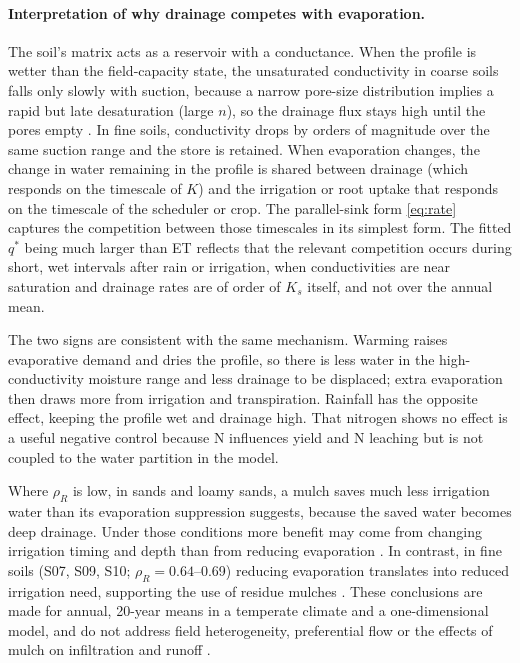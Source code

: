 \documentclass[preprint,12pt,authoryear]{elsarticle}
\begin{document}
\paragraph{Interpretation of why drainage competes with evaporation.}
The soil's matrix acts as a reservoir with a conductance. When the profile is wetter than the field-capacity state, the unsaturated conductivity in coarse soils falls only slowly with suction, because a narrow pore-size distribution implies a rapid but late desaturation (large $n$), so the drainage flux stays high until the pores empty \citep{Hillel1998,Brady2016}. In fine soils, conductivity drops by orders of magnitude over the same suction range and the store is retained. When evaporation changes, the change in water remaining in the profile is shared between drainage (which responds on the timescale of $K$) and the irrigation or root uptake that responds on the timescale of the scheduler or crop. The parallel-sink form \cref{eq:rate} captures the competition between those timescales in its simplest form. The fitted $q^\ast$ being much larger than ET reflects that the relevant competition occurs during short, wet intervals after rain or irrigation, when conductivities are near saturation and drainage rates are of order of $K_s$ itself, and not over the annual mean.

The two signs are consistent with the same mechanism. Warming raises evaporative demand and dries the profile, so there is less water in the high-conductivity moisture range and less drainage to be displaced; extra evaporation then draws more from irrigation and transpiration. Rainfall has the opposite effect, keeping the profile wet and drainage high. That nitrogen shows no effect is a useful negative control because N influences yield and N leaching but is not coupled to the water partition in the model.

Where $\rho_R$ is low, in sands and loamy sands, a mulch saves much less irrigation water than its evaporation suppression suggests, because the saved water becomes deep drainage. Under those conditions more benefit may come from changing irrigation timing and depth than from reducing evaporation \citep{Fereres2007,Playan2006}. In contrast, in fine soils (S07, S09, S10; $\rho_R=0.64$--0.69) reducing evaporation translates into reduced irrigation need, supporting the use of residue mulches \citep{BalwinderSingh2011,Vuaille2024}. These conclusions are made for annual, 20-year means in a temperate climate and a one-dimensional model, and do not address field heterogeneity, preferential flow or the effects of mulch on infiltration and runoff \citep{Jarvis2007,Beven2013}.
\end{document}
